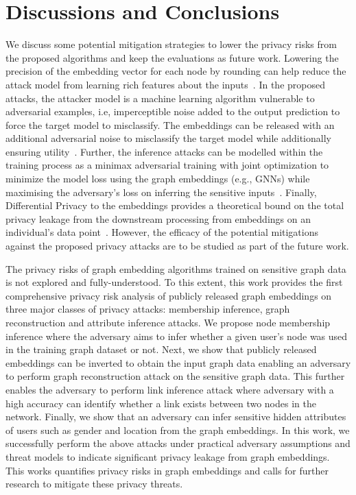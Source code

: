 \section{Discussions and Conclusions}\label{conclusions}

We discuss some potential mitigation strategies to lower the privacy risks from the proposed algorithms and keep the evaluations as future work.
Lowering the precision of the embedding vector for each node by rounding can help reduce the attack model from learning rich features about the inputs~\cite{membershipinf,nlp}.
In the proposed attacks, the attacker model is a machine learning algorithm vulnerable to adversarial examples, i.e, imperceptible noise added to the output prediction to force the target model to misclassify.
The embeddings can be released with an additional adversarial noise to misclassify the target model while additionally ensuring utility~\cite{attriguard,memguard}.
Further, the inference attacks can be modelled within the training process as a minimax adversarial training with joint optimization to minimize the model loss using the graph embeddings (e.g., GNNs) while maximising the adversary's loss on inferring the sensitive inputs~\cite{advreg,textembleak}.
Finally, Differential Privacy to the embeddings provides a theoretical bound on the total privacy leakage from the downstream processing from embeddings on an individual's data point~\cite{dptext,dpne}.
However, the efficacy of the potential mitigations against the proposed privacy attacks are to be studied as part of the future work.



The privacy risks of graph embedding algorithms trained on sensitive graph data is not explored and fully-understood.
To this extent, this work provides the first comprehensive privacy risk analysis of publicly released graph embeddings on three major classes of privacy attacks: membership inference, graph reconstruction and attribute inference attacks.
We propose node membership inference where the adversary aims to infer whether a given user's node was used in the training graph dataset or not.
Next, we show that publicly released embeddings can be inverted to obtain the input graph data enabling an adversary to perform graph reconstruction attack on the sensitive graph data.
This further enables the adversary to perform link inference attack where adversary with a high accuracy can identify whether a link exists between two nodes in the network.
Finally, we show that an adversary can infer sensitive hidden attributes of users such as gender and location from the graph embeddings.
In this work, we successfully perform the above attacks under practical adversary assumptions and threat models to indicate significant privacy leakage from graph embeddings.
This works quantifies privacy risks in graph embeddings and calls for further research to mitigate these privacy threats.
